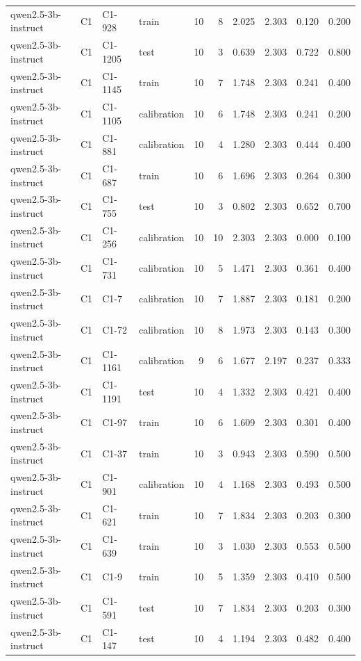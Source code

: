 \begin{table}
\begin{tabular}{llllrrrrrr}
qwen2.5-3b-instruct & C1 & C1-928 & train & 10 & 8 & 2.025 & 2.303 & 0.120 & 0.200 \\
qwen2.5-3b-instruct & C1 & C1-1205 & test & 10 & 3 & 0.639 & 2.303 & 0.722 & 0.800 \\
qwen2.5-3b-instruct & C1 & C1-1145 & train & 10 & 7 & 1.748 & 2.303 & 0.241 & 0.400 \\
qwen2.5-3b-instruct & C1 & C1-1105 & calibration & 10 & 6 & 1.748 & 2.303 & 0.241 & 0.200 \\
qwen2.5-3b-instruct & C1 & C1-881 & calibration & 10 & 4 & 1.280 & 2.303 & 0.444 & 0.400 \\
qwen2.5-3b-instruct & C1 & C1-687 & train & 10 & 6 & 1.696 & 2.303 & 0.264 & 0.300 \\
qwen2.5-3b-instruct & C1 & C1-755 & test & 10 & 3 & 0.802 & 2.303 & 0.652 & 0.700 \\
qwen2.5-3b-instruct & C1 & C1-256 & calibration & 10 & 10 & 2.303 & 2.303 & 0.000 & 0.100 \\
qwen2.5-3b-instruct & C1 & C1-731 & calibration & 10 & 5 & 1.471 & 2.303 & 0.361 & 0.400 \\
qwen2.5-3b-instruct & C1 & C1-7 & calibration & 10 & 7 & 1.887 & 2.303 & 0.181 & 0.200 \\
qwen2.5-3b-instruct & C1 & C1-72 & calibration & 10 & 8 & 1.973 & 2.303 & 0.143 & 0.300 \\
qwen2.5-3b-instruct & C1 & C1-1161 & calibration & 9 & 6 & 1.677 & 2.197 & 0.237 & 0.333 \\
qwen2.5-3b-instruct & C1 & C1-1191 & test & 10 & 4 & 1.332 & 2.303 & 0.421 & 0.400 \\
qwen2.5-3b-instruct & C1 & C1-97 & train & 10 & 6 & 1.609 & 2.303 & 0.301 & 0.400 \\
qwen2.5-3b-instruct & C1 & C1-37 & train & 10 & 3 & 0.943 & 2.303 & 0.590 & 0.500 \\
qwen2.5-3b-instruct & C1 & C1-901 & calibration & 10 & 4 & 1.168 & 2.303 & 0.493 & 0.500 \\
qwen2.5-3b-instruct & C1 & C1-621 & train & 10 & 7 & 1.834 & 2.303 & 0.203 & 0.300 \\
qwen2.5-3b-instruct & C1 & C1-639 & train & 10 & 3 & 1.030 & 2.303 & 0.553 & 0.500 \\
qwen2.5-3b-instruct & C1 & C1-9 & train & 10 & 5 & 1.359 & 2.303 & 0.410 & 0.500 \\
qwen2.5-3b-instruct & C1 & C1-591 & test & 10 & 7 & 1.834 & 2.303 & 0.203 & 0.300 \\
qwen2.5-3b-instruct & C1 & C1-147 & test & 10 & 4 & 1.194 & 2.303 & 0.482 & 0.400 \\

\end{tabular}
\end{table}
